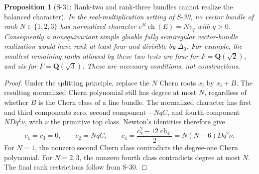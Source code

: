 \documentclass[11pt,a4paper]{article}
\newtheorem{proposition}[theorem]{Proposition}
\theoremstyle{definition}
\begin{document}
\begin{proposition}[S-31: Rank-two and rank-three bundles cannot realize the balanced character]
\label{prop:semireg-rm-low-rank-bundles}
In the real-multiplication setting of S-30, no vector
bundle of rank $N\in\{1,2,3\}$ has normalized character
$e^B\operatorname{ch}(E)=Nv_q$ with $q>0$.
Consequently a nonequivariant simple gluable fully
semiregular vector-bundle realization would have rank
at least four and divisible by $\Delta_0$.
For example, the smallest remaining ranks allowed by
these two tests are four for $F=\mathbf Q(\sqrt2)$,
and six for $F=\mathbf Q(\sqrt3)$.
These are necessary conditions, not constructions.
\end{proposition}
\begin{proof}
Under the splitting principle, replace the $N$ Chern
roots $x_i$ by $x_i+B$. The resulting normalized Chern
polynomial still has degree at most $N$, regardless of
whether $B$ is the Chern class of a line bundle.
The normalized character has first and third components
zero, second component $-NqC$, and fourth component
$NDq^2\nu$, with $\nu$ the primitive top class.
Newton's identities therefore give
\[
 \bar c_1=\bar c_3=0,\qquad
 \bar c_2=NqC,\qquad
 \bar c_4=\frac{\bar c_2^2-12\overline{\operatorname{ch}}_4}{2}
          =N(N-6)Dq^2\nu.
 \tag{S31.1}
\]
For $N=1$, the nonzero second Chern class contradicts
the degree-one Chern polynomial. For $N=2,3$, the
nonzero fourth class contradicts degree at most $N$.
The final rank restrictions follow from S-30.
\end{proof}
\end{document}
